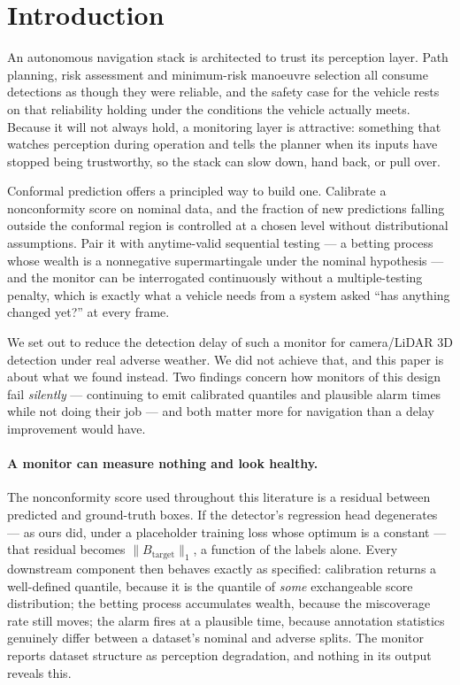 \section{Introduction}
\label{sec:introduction}

An autonomous navigation stack is architected to trust its perception
layer. Path planning, risk assessment and minimum-risk manoeuvre selection
all consume detections as though they were reliable, and the safety case
for the vehicle rests on that reliability holding under the conditions the
vehicle actually meets. Because it will not always hold, a monitoring layer
is attractive: something that watches perception during operation and tells
the planner when its inputs have stopped being trustworthy, so the stack
can slow down, hand back, or pull over.

Conformal prediction offers a principled way to build one. Calibrate a
nonconformity score on nominal data, and the fraction of new predictions
falling outside the conformal region is controlled at a chosen level
without distributional assumptions. Pair it with anytime-valid sequential
testing --- a betting process whose wealth is a nonnegative supermartingale
under the nominal hypothesis --- and the monitor can be interrogated
continuously without a multiple-testing penalty, which is exactly what a
vehicle needs from a system asked ``has anything changed yet?'' at every
frame.

We set out to reduce the detection delay of such a monitor for camera/LiDAR
3D detection under real adverse weather. We did not achieve that, and this
paper is about what we found instead. Two findings concern how monitors of
this design fail \emph{silently} --- continuing to emit calibrated
quantiles and plausible alarm times while not doing their job --- and both
matter more for navigation than a delay improvement would have.

\paragraph{A monitor can measure nothing and look healthy.}
The nonconformity score used throughout this literature is a residual
between predicted and ground-truth boxes. If the detector's regression head
degenerates --- as ours did, under a placeholder training loss whose
optimum is a constant --- that residual becomes $\lVert B_{\mathrm{target}}
\rVert_1$, a function of the labels alone. Every downstream component then
behaves exactly as specified: calibration returns a well-defined quantile,
because it is the quantile of \emph{some} exchangeable score distribution;
the betting process accumulates wealth, because the miscoverage rate still
moves; the alarm fires at a plausible time, because annotation statistics
genuinely differ between a dataset's nominal and adverse splits. The
monitor reports dataset structure as perception degradation, and nothing in
its output reveals this.

